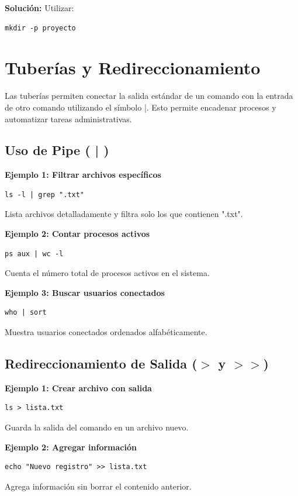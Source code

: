 \documentclass[12pt,a4paper]{article}
\begin{document}
\textbf{Solución:}
Utilizar:
\begin{lstlisting}
mkdir -p proyecto
\end{lstlisting}

\section{Tuberías y Redireccionamiento}

Las tuberías permiten conectar la salida estándar de un comando con la entrada de otro comando utilizando el símbolo |. 
Esto permite encadenar procesos y automatizar tareas administrativas.

\subsection{Uso de Pipe ( | )}

\textbf{Ejemplo 1: Filtrar archivos específicos}
\begin{lstlisting}
ls -l | grep ".txt"
\end{lstlisting}
Lista archivos detalladamente y filtra solo los que contienen ".txt".

\textbf{Ejemplo 2: Contar procesos activos}
\begin{lstlisting}
ps aux | wc -l
\end{lstlisting}
Cuenta el número total de procesos activos en el sistema.

\textbf{Ejemplo 3: Buscar usuarios conectados}
\begin{lstlisting}
who | sort
\end{lstlisting}
Muestra usuarios conectados ordenados alfabéticamente.


\subsection{Redireccionamiento de Salida ($>$ y $>>$)}

\textbf{Ejemplo 1: Crear archivo con salida}
\begin{lstlisting}
ls > lista.txt
\end{lstlisting}
Guarda la salida del comando en un archivo nuevo.

\textbf{Ejemplo 2: Agregar información}
\begin{lstlisting}
echo "Nuevo registro" >> lista.txt
\end{lstlisting}
Agrega información sin borrar el contenido anterior.
\end{document}
